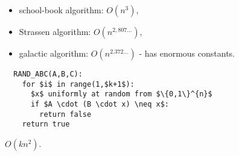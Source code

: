 \documentclass[a4paper, 12pt]{book}
\theoremstyle{definition}
\theoremstyle{remark}
\begin{document}
\begin{itemize}
  \item school-book algorithm: $O\left(n^3\right)$,
  \item Strassen algorithm: $O\left(n^{2,807\dots}\right)$,
  \item galactic algorithm: $O\left(n^{2.372\dots}\right)$ - has enormous constants.
\end{itemize}
\begin{lstlisting}
  RAND_ABC(A,B,C):
    for $i$ in range(1,$k+1$):
      $x$ uniformly at random from $\{0,1\}^{n}$
      if $A \cdot (B \cdot x) \neq x$:
        return false
    return true
\end{lstlisting}
$O\left(k n^2\right)$. \\


\end{document}
